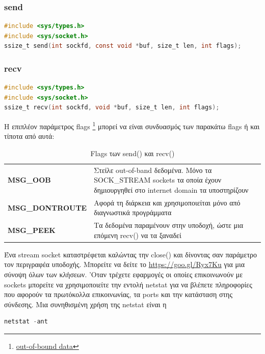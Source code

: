 \subsubsection*{send}
\begin{lstlisting}[language=C,breaklines=true, frame=none, backgroundcolor=\color{lightgray}, basicstyle=\footnotesize\ttfamily]
#include <sys/types.h>          
#include <sys/socket.h>
ssize_t send(int sockfd, const void *buf, size_t len, int flags);
\end{lstlisting}

\subsubsection*{recv}
\begin{lstlisting}[language=C,breaklines=true, frame=none, backgroundcolor=\color{lightgray}, basicstyle=\footnotesize\ttfamily]
#include <sys/types.h>          
#include <sys/socket.h>
ssize_t recv(int sockfd, void *buf, size_t len, int flags);
\end{lstlisting}

Η επιπλέον παράμετρος flags \footnote{\href{http://www.gnu.org/software/libc/manual/html\_node/Out\_002dof\_002dBand-Data.html}{out-of-bound data}} μπορεί να είναι συνδυασμός των παρακάτω flags ή και τίποτα από αυτά:

\begin{table}[h]
	\begin{tabularx}{\columnwidth}{l|X}
		\textbf{MSG\_OOB} &  Στείλε out-of-band δεδομένα. Μόνο τα SOCK\_STREAM sockets τα οποία έχουν δημιουργηθεί στο internet domain τα
		υποστηρίζουν \\
		\textbf{MSG\_DONTROUTE} & Αφορά τη διάρκεια και χρησιμοποιείται μόνο από διαγνωστικά προγράμματα \\
		\textbf{MSG\_PEEK} & Τα δεδομένα παραμένουν στην υποδοχή, ώστε μια επόμενη recv() να τα ξαναδεί
	\end{tabularx}  
	\caption{Flags των send() και recv()}
\end{table}

Ένα stream socket καταστρέφεται καλώντας την close() και δίνοντας σαν παράμετρο τον περιγραφέα υποδοχής.
Μπορείτε να δείτε το \href{https://goo.gl/Ryx7Ku}{https://goo.gl/Ryx7Ku} για μια σύνοψη όλων των κλήσεων. 'Οταν τρέχετε εφαρμογές οι οποίες επικοινωνούν με sockets μπορείτε να χρησιμοποιείτε την εντολή netstat για να βλέπετε πληροφορίες που αφορούν τα  πρωτόκολλα επικοινωνίας, τα ports και την κατάσταση στης σύνδεσης. Μια συνηθισμένη χρήση της netstat είναι η
\begin{lstlisting}[language=C,breaklines=true, basicstyle=\scriptsize\ttfamily]
netstat -ant
\end{lstlisting}



